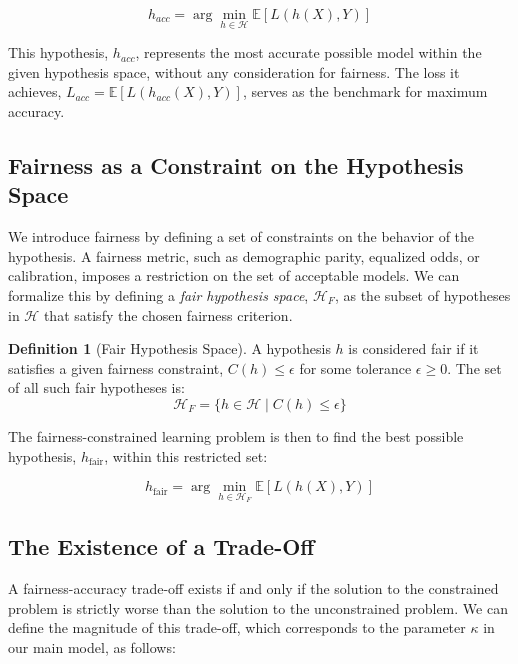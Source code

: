 \documentclass[12pt,a4paper]{article}
\theoremstyle{definition}
\newtheorem{definition}{Definition}
\theoremstyle{remark}
\begin{document}
\begin{equation}
h_{acc} = \arg\min_{h \in \mathcal{H}} \mathbb{E}[L(h(X), Y)]
\end{equation}

This hypothesis, $h_{acc}$, represents the most accurate possible model within the given hypothesis space, without any consideration for fairness. The loss it achieves, $L_{acc} = \mathbb{E}[L(h_{acc}(X), Y)]$, serves as the benchmark for maximum accuracy.

\subsection{Fairness as a Constraint on the Hypothesis Space}

We introduce fairness by defining a set of constraints on the behavior of the hypothesis. A fairness metric, such as demographic parity, equalized odds, or calibration, imposes a restriction on the set of acceptable models. We can formalize this by defining a \textit{fair hypothesis space}, $\mathcal{H}_F$, as the subset of hypotheses in $\mathcal{H}$ that satisfy the chosen fairness criterion.

\begin{definition}[Fair Hypothesis Space]
A hypothesis $h$ is considered fair if it satisfies a given fairness constraint, $C(h) \leq \epsilon$ for some tolerance $\epsilon \geq 0$. The set of all such fair hypotheses is:
\begin{equation}
\mathcal{H}_F = \{h \in \mathcal{H} \mid C(h) \leq \epsilon \}
\end{equation}
\end{definition}

The fairness-constrained learning problem is then to find the best possible hypothesis, $h_{\text{fair}}$, within this restricted set:

\begin{equation}
h_{\text{fair}} = \arg\min_{h \in \mathcal{H}_F} \mathbb{E}[L(h(X), Y)]
\end{equation}

\subsection{The Existence of a Trade-Off}

A fairness-accuracy trade-off exists if and only if the solution to the constrained problem is strictly worse than the solution to the unconstrained problem. We can define the magnitude of this trade-off, which corresponds to the parameter $\kappa$ in our main model, as follows:
\end{document}

